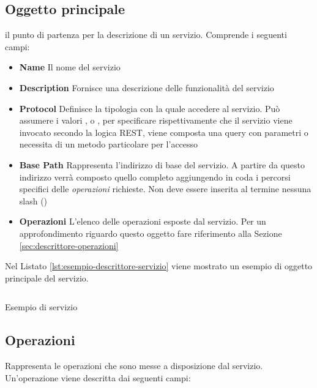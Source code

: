 \subsection{Oggetto principale\label{sec:oggetto-principale-servizi}}

\upe il punto di partenza per la descrizione di un servizio. Comprende i seguenti campi:

\begin{itemize}
	\item \textbf{Name} Il nome del servizio
	\item \textbf{Description} Fornisce una descrizione delle funzionalità del servizio
	\item \textbf{Protocol} Definisce la tipologia con la quale accedere al servizio. Può assumere i valori ,  o , per specificare rispettivamente che il servizio viene invocato secondo la logica REST, viene composta una query con parametri o necessita di un metodo particolare per l'accesso
	\item \textbf{Base Path} Rappresenta l'indirizzo di base del servizio. A partire da questo indirizzo verrà composto quello completo aggiungendo in coda i percorsi specifici delle \emph{operazioni} richieste. Non deve essere inserita al termine nessuna slash (\virgolette{/})
	\item \textbf{Operazioni} L'elenco delle operazioni esposte dal servizio. Per un approfondimento riguardo questo oggetto fare riferimento alla Sezione \ref{sec:descrittore-operazioni}
\end{itemize}

Nel Listato \ref{lst:esempio-descrittore-servizio} viene mostrato un esempio di oggetto principale del servizio.

\begin{listing}[H]
	\inputminted{json}{5-implementazione-backend/Codice/esempio_descrittore_servizio.json}
	\caption{Esempio di servizio}
	\label{lst:esempio-descrittore-servizio}
\end{listing}

\subsection{Operazioni\label{sec:descrittore-operazioni}}

Rappresenta le operazioni che sono messe a disposizione dal servizio. Un'operazione viene descritta dai seguenti campi:

